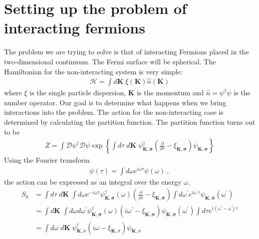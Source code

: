 \documentclass[14pt]{extarticle}
\begin{document}
\section{Setting up the problem of interacting fermions}
The problem we are trying to solve is that of interacting Fermions placed in the two-dimensional continuum. The Fermi surface will be spherical. The Hamiltonian for  the non-interacting system is very simple:
\begin{equation}\begin{aligned}
\mathcal{H} = \int d\mathbf{K}\; \xi(\mathbf{K})\hat n(\mathbf{K})
\end{aligned}\end{equation}
where \(\xi\) is the single particle dispersion, \(\mathbf K\) is the momentum and \(\hat n = \psi^\dagger \psi\) is the number operator. Our goal is to determine what happens when we bring interactions into the problem. The action for the non-interacting case is determined by calculating the partition function. The partition function turns out to be
\begin{equation}\begin{aligned}
	Z = \int \mathcal{D}\psi^\dagger \mathcal{D}\psi\exp\left\{\int d\tau\;d\mathbf{K}\;\psi_\mathbf{K,\sigma}^\dagger\left(\frac{\partial}{\partial \tau} - \xi_\mathbf{K,\sigma} \right)\psi_\mathbf{K,\sigma}\right\}
\end{aligned}\end{equation}
Using the Fourier transform
\begin{equation}\begin{aligned}
\psi(\tau) = \int d\omega e^{i\omega \tau}\psi(\omega)~,
\end{aligned}\end{equation}
the action can be expressed as an integral over the energy \(\omega\).
\begin{equation}\begin{aligned}
	S_0 &= \int d\tau\;d\mathbf{K}\;\int d\omega e^{-i\omega \tau}\psi_\mathbf{K,\sigma}^\dagger(\omega)\left(\frac{\partial}{\partial \tau} - \xi_\mathbf{K,\sigma} \right)\int d\omega^\prime e^{i\omega^\prime \tau}\psi_\mathbf{K,\sigma}(\omega^\prime)\\
	    &= \int d\mathbf{K}\;\int d\omega d\omega^\prime \psi_\mathbf{K,\sigma}^\dagger(\omega)\left(i\omega^\prime - \xi_\mathbf{K,\sigma} \right) \psi_\mathbf{K,\sigma}(\omega^\prime)\int d\tau e^{i\left(\omega^\prime - \omega\right)\tau}\\
	    &= \int d\omega\;d\mathbf{K}\; \psi_{\mathbf K,\sigma}^\dagger \left(i\omega - \xi_{\mathbf{K},\sigma}\right)\psi_{\mathbf{K},\sigma}
\end{aligned}\end{equation}
\end{document}
